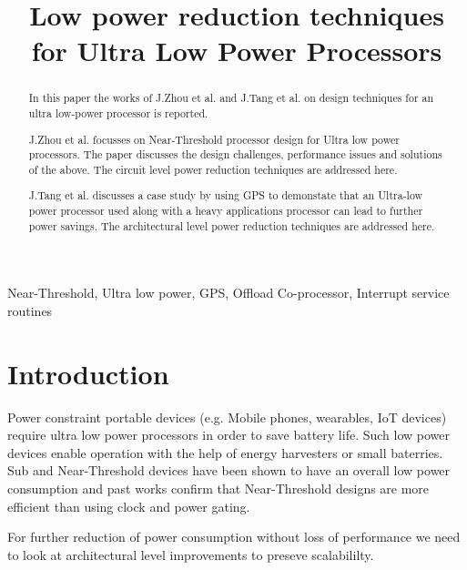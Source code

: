 \documentclass[conference]{IEEEtran}
\begin{document}
\title{Low power reduction techniques for Ultra Low Power Processors}

\author{
}

\maketitle

\begin{abstract}
In this paper the works of J.Zhou et al. \cite{b1} and J.Tang et al. \cite{b2}
on design techniques for an ultra low-power processor is reported.

J.Zhou et al. focusses on Near-Threshold processor design for Ultra low power
processors. The paper discusses the design challenges, performance issues and solutions
of the above. The circuit level power reduction techniques are addressed here.

J.Tang et al. discusses a case study by using GPS to demonstate that an
Ultra-low power processor used along with a heavy applications processor can
lead to further power savings. The architectural level power reduction
techniques are addressed here.
\end{abstract}

\begin{IEEEkeywords}
Near-Threshold, Ultra low power, GPS, Offload Co-processor, Interrupt service
routines
\end{IEEEkeywords}

\section{Introduction} \label{sec:introduction}

Power constraint portable devices (e.g. Mobile phones, wearables, IoT
devices) require ultra low power processors in order to save battery life. Such
low power devices enable operation with the help of energy harvesters or small baterries.
Sub and Near-Threshold devices have been shown to have an overall low power
consumption and past works confirm that Near-Threshold designs are more
efficient than using clock and power gating.

For further reduction of power consumption without loss of performance we need to look at architectural
level improvements to preseve scalabililty.
\end{document}
